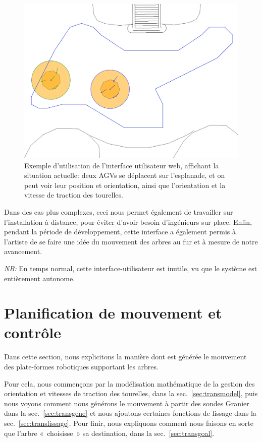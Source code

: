 \documentclass[french,A4paper,]{book}
\begin{document}
\begin{figure}
\centering
\includegraphics[width=1.00000\textwidth]{imgs/simulateur-right.png}
\caption{Exemple d'utilisation de l'interface utilisateur web, affichant
la situation actuelle: deux AGVs se déplacent sur l'esplanade, et on
peut voir leur position et orientation, ainsi que l'orientation et la
vitesse de traction des tourelles.}\label{fig:simulateur-right}
\end{figure}

Dans des cas plus complexes, ceci nous permet également de travailler
sur l'installation à distance, pour éviter d'avoir besoin d'ingénieurs
sur place. Enfin, pendant la période de développement, cette interface a
également permis à l'artiste de se faire une idée du mouvement des
arbres au fur et à mesure de notre avancement.

\emph{NB:} En temps normal, cette interface-utilisateur est inutile, vu
que le système est entièrement autonome.

\section{Planification de mouvement et contrôle}\label{sec:transplanif}

Dans cette section, nous explicitons la manière dont est générée le
mouvement des plate-formes robotiques supportant les arbres.

Pour cela, nous commençons par la modélisation mathématique de la
gestion des orientation et vitesses de traction des tourelles, dans la
sec.~\ref{sec:transmodel}, puis nous voyons comment nous générons le
mouvement à partir des sondes Granier dans la sec.~\ref{sec:transgene}
et nous ajoutons certaines fonctions de lissage dans la
sec.~\ref{sec:translissage}. Pour finir, nous expliquons comment nous
faisons en sorte que l'arbre «~choisisse~» sa destination, dans la
sec.~\ref{sec:transgoal}.
\end{document}
